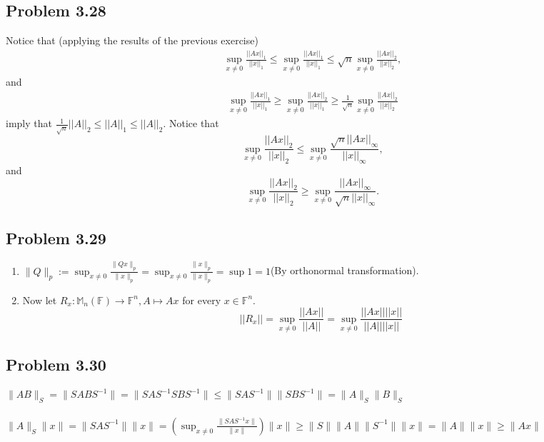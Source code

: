 \documentclass[letterpaper,12pt]{article}
\theoremstyle{definition}
\begin{document}
\begin{spacing}{1.3}{}
\begin{enumerate}
\end{enumerate}

\subsection*{Problem 3.28}

    Notice that (applying the results of the previous exercise)
	\begin{align*}
	\sup_{x\neq 0}\frac{||Ax||_1}{||x||_1}\leq
	\sup_{x\neq 0}\frac{||Ax||_1}{||x||_1}\leq
	\sqrt{n}\sup_{x\neq 0}\frac{||Ax||_2}{||x||_2},
	\end{align*}
	and
	\begin{align*}
	\sup_{x\neq 0}\frac{||Ax||_1}{||x||_1}\geq
	\sup_{x\neq 0}\frac{||Ax||_2}{||x||_1}\geq
	\frac{1}{\sqrt{n}}\sup_{x\neq 0}\frac{||Ax||_2}{||x||_2}
	\end{align*}
	imply that $\frac{1}{\sqrt{n}}||A||_2\leq||A||_1\leq||A||_2$.
		Notice that
	\begin{equation*}
	\sup_{x\neq 0}\frac{||Ax||_2}{||x||_2}\leq
	\sup_{x\neq 0}\frac{\sqrt{n}||Ax||_\infty}{||x||_\infty},
	\end{equation*}
	and
	\begin{equation*}
	\sup_{x\neq 0}\frac{||Ax||_2}{||x||_2}\geq
	\sup_{x\neq 0}\frac{||Ax||_\infty}{\sqrt{n}||x||_\infty}.
	\end{equation*}


\subsection*{Problem 3.29}
	\begin{enumerate}
	    \item
	    $\|Q\|_p := \sup_{x \neq 0} \frac{\|Qx\|_p}{\|x\|_p} = \sup_{x \neq 0} \frac{\|x\|_p}{\|x\|_p} = \sup 1 = 1 $(By orthonormal transformation). \\

	\item
	Now let $R_x:\mathbb M_n(\mathbb F)\to\mathbb F^n, A\mapsto Ax$ for every $x\in\mathbb F^n$.
	\begin{equation*}
	||R_x||=\sup_{x\neq 0}\frac{||Ax||}{||A||}=
	\sup_{x\neq 0}\frac{||Ax||||x||}{||A||||x||}
	\end{equation*}

	\end{enumerate}


\subsection*{Problem 3.30}
	$\|AB\|_S = \|SABS^{-1}\| = \|SAS^{-1} SBS^{-1}\| \leq \|SAS^{-1}\| \|SBS^{-1}\| = \|A\|_S \|B\|_S  $ \\\\
	$\|A\|_{S} \|x\| = \|SAS^{-1}\| \|x\| = (\sup_{x \neq 0} \frac{\|SAS^{-1} x\|}{\|x\|}) \|x\| \geq \|S\| \|A\| \|S^{-1}\| \|x\| = \|A\| \|x\| \geq \|Ax\| $ \



\end{spacing}
\end{document}
